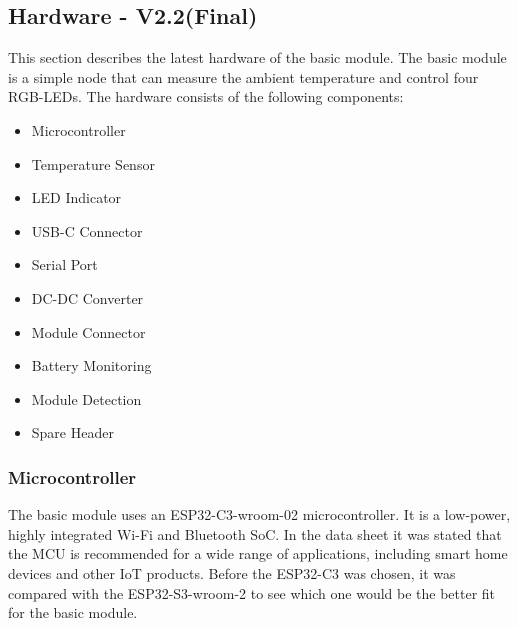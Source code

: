 \subsection{Hardware - V2.2(Final)}


    This section describes the latest hardware of the basic module. The basic module is a 
    simple node that can measure the ambient temperature and control four RGB-LEDs.
    The hardware consists of the following components:

    \begin{itemize}
        \item Microcontroller
        \item Temperature Sensor
        \item LED Indicator
        \item USB-C Connector
        \item Serial Port
        \item DC-DC Converter
        \item Module Connector
        \item Battery Monitoring
        \item Module Detection
        \item Spare Header
    \end{itemize}

    \subsubsection{Microcontroller}
        \vfill
        The basic module uses an ESP32-C3-wroom-02 \cite{noauthor_esp32-c3_2023} microcontroller. 
        It is a low-power, highly integrated Wi-Fi and Bluetooth SoC. In the data sheet 
        it was stated that the MCU is recommended for a wide range of applications, including smart home devices 
        and other IoT products.
        Before the ESP32-C3 was chosen, it was compared with the ESP32-S3-wroom-2\cite{noauthor_esp32-s3-wroom-2_2022} 
        to see which one would be the better fit for the basic module. 

